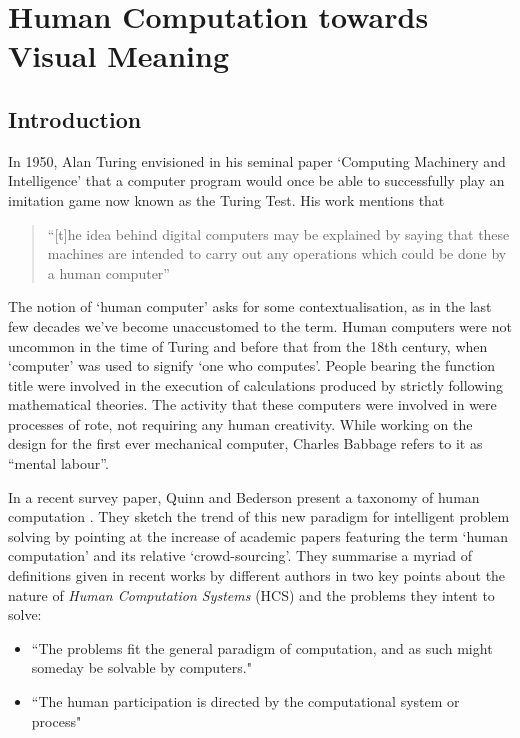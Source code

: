 \chapter{Human Computation towards Visual Meaning}
\label{ch:humancomputation}

\section{Introduction} %
\label{sec:introduction}

In 1950, Alan Turing envisioned in his seminal paper `Computing Machinery and Intelligence' that a computer program would once be able to successfully play an imitation game now known as the Turing Test. His work mentions that
\begin{quote}
  ``[t]he idea behind digital computers may be explained by saying that these machines are intended to carry out any operations which could be done by a human computer''\cite{Turing:1950wi}
\end{quote}

The notion of `human computer' asks for some contextualisation, as in the last few decades we've become unaccustomed to the term. Human computers were not uncommon in the time of Turing and before that from the 18th century, when `computer' was used to signify `one who computes'\cite{grier2007computers}. People bearing the function title were involved in the execution of calculations produced by strictly following mathematical theories. The activity that these computers were involved in were processes of rote, not requiring any human creativity. While working on the design for the first ever mechanical computer, Charles Babbage refers to it as ``mental labour''\cite[Ch.\ 20]{Babbage:1832vu}.


In a recent survey paper, Quinn and Bederson present a taxonomy of human computation \cite{Quinn:2011us}. They sketch the trend of this new paradigm for intelligent problem solving by pointing at the increase of academic papers featuring the term `human computation' and its relative `crowd-sourcing'. They summarise a myriad of definitions given in recent works by different authors in two key points about the nature of \emph{Human Computation Systems} (HCS) and the problems they intent to solve:

\begin{itemize}
  \item ``The problems fit the general paradigm of computation, and as such might someday be solvable by computers."
  \item ``The human participation is directed by the computational system or process"
\end{itemize}


